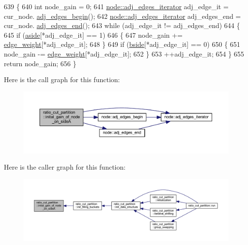 \begin{DoxyCode}
639 \{
640     \textcolor{keywordtype}{int} node\_gain = 0;
641     \mbox{\hyperlink{classnode_a12cb1a2167f5f03c054de5e707d3156f}{node::adj\_edges\_iterator}} adj\_edge\_it = cur\_node.
      \mbox{\hyperlink{classnode_a788d3e932a5c164caa5ec82aa47551b2}{adj\_edges\_begin}}();
642     \mbox{\hyperlink{classnode_a12cb1a2167f5f03c054de5e707d3156f}{node::adj\_edges\_iterator}} adj\_edges\_end = cur\_node.
      \mbox{\hyperlink{classnode_aa1e7887d29390297580769454f769ad6}{adj\_edges\_end}}();
643     \textcolor{keywordflow}{while} (adj\_edge\_it != adj\_edges\_end)
644     \{
645     \textcolor{keywordflow}{if} (\mbox{\hyperlink{classratio__cut__partition_a112bfcfb9d05d5bbdeb29576a61399e1}{aside}}[*adj\_edge\_it] == 1)
646     \{
647         node\_gain += \mbox{\hyperlink{classratio__cut__partition_a48a85c82fb09b83c9d494d6d1232fab2}{edge\_weight}}[*adj\_edge\_it];
648     \}
649     \textcolor{keywordflow}{if} (\mbox{\hyperlink{classratio__cut__partition_ab9c1166efb1cbb65ff6c55bb6e3c9e6d}{bside}}[*adj\_edge\_it] == 0)
650     \{
651         node\_gain -= \mbox{\hyperlink{classratio__cut__partition_a48a85c82fb09b83c9d494d6d1232fab2}{edge\_weight}}[*adj\_edge\_it];
652     \}
653     ++adj\_edge\_it;
654     \}
655     \textcolor{keywordflow}{return} node\_gain;
656 \}
\end{DoxyCode}
Here is the call graph for this function\+:\nopagebreak
\begin{figure}[H]
\begin{center}
\leavevmode
\includegraphics[width=350pt]{classratio__cut__partition_a0f2caf60f5a9be58c983c84655537d51_cgraph}
\end{center}
\end{figure}
Here is the caller graph for this function\+:\nopagebreak
\begin{figure}[H]
\begin{center}
\leavevmode
\includegraphics[width=350pt]{classratio__cut__partition_a0f2caf60f5a9be58c983c84655537d51_icgraph}
\end{center}
\end{figure}
